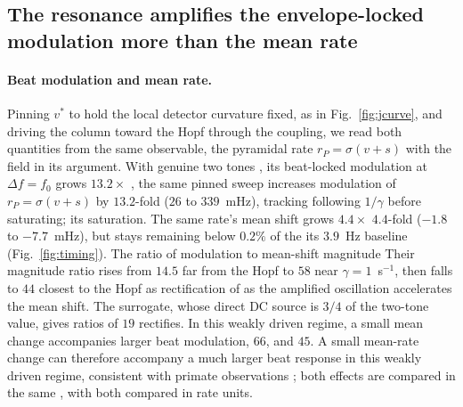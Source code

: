 \documentclass[11pt,a4paper]{article}
\newcommand{\Sig}{\sigma}
\providecommand{\DIFaddtex}[1]{{\protect\color{blue} \sf #1}} %
\providecommand{\DIFdeltex}[1]{{\protect\color{red} \scriptsize #1}} %
\providecommand{\DIFaddbegin}{} %
\providecommand{\DIFaddend}{} %
\providecommand{\DIFdelbegin}{} %
\providecommand{\DIFdelend}{} %
\providecommand{\DIFadd}[1]{\texorpdfstring{\DIFaddtex{#1}}{#1}} %
\providecommand{\DIFdel}[1]{\texorpdfstring{\DIFdeltex{#1}}{}} %
\begin{document}
\DIFdelbegin \subsection{\DIFdel{The resonance amplifies the envelope-locked modulation more than the mean rate}}%
\addtocounter{subsection}{-1}%
\DIFdelend \DIFaddbegin \paragraph{\DIFadd{Beat modulation and mean rate.}}\DIFaddend \label{sec:timing}
\DIFdelbegin \DIFdel{Pinning $v^*$ to hold the local detector
curvature fixed, as in Fig.~\ref{fig:jcurve}, and driving the column toward the Hopf
through the coupling, we read both quantities from the same observable, the pyramidal
rate $r_P=\Sig(v+s)$ with the field in its argument. }\DIFdelend With genuine two tones \DIFdelbegin \DIFdel{, its
beat-locked modulation }\DIFdelend at $\Delta f=f_0$\DIFdelbegin \DIFdel{grows $13.2\times$ }\DIFdelend \DIFaddbegin \DIFadd{, the same pinned sweep
increases modulation of $r_P=\Sig(v+s)$ by $13.2$-fold }\DIFaddend ($26$ to $339$~mHz),
\DIFdelbegin \DIFdel{tracking }\DIFdelend \DIFaddbegin \DIFadd{following }\DIFaddend $1/\gamma$ before \DIFdelbegin \DIFdel{saturating; its }\DIFdelend \DIFaddbegin \DIFadd{saturation. The same rate's }\DIFaddend mean shift grows
\DIFdelbegin \DIFdel{$4.4\times$ }\DIFdelend \DIFaddbegin \DIFadd{$4.4$-fold }\DIFaddend ($-1.8$ to $-7.7$~mHz), \DIFdelbegin \DIFdel{but stays }\DIFdelend \DIFaddbegin \DIFadd{remaining }\DIFaddend below $0.2\%$ of \DIFdelbegin \DIFdel{the }\DIFdelend \DIFaddbegin \DIFadd{its
}\DIFaddend $3.9$~Hz baseline (Fig.~\ref{fig:timing}). \DIFdelbegin \DIFdel{The ratio of modulation to mean-shift magnitude }\DIFdelend \DIFaddbegin \DIFadd{Their magnitude ratio }\DIFaddend rises
from $14.5$ \DIFdelbegin \DIFdel{far from the Hopf }\DIFdelend to $58$ near $\gamma=1$~s$^{-1}$, then falls to $44$ \DIFdelbegin \DIFdel{closest
to the Hopf as
rectification of }\DIFdelend \DIFaddbegin \DIFadd{as
}\DIFaddend the amplified oscillation \DIFdelbegin \DIFdel{accelerates the mean shift. The surrogate, whose direct DC source is $3/4$ of the two-tone value, gives ratios
of $19$}\DIFdelend \DIFaddbegin \DIFadd{rectifies. In this weakly driven regime, a small
mean change accompanies larger beat modulation}\DIFaddend , \DIFdelbegin \DIFdel{$66$, and $45$. A small
mean-rate change can therefore accompany a much
larger beat response in this weakly driven regime, }\DIFdelend consistent with primate observations
\cite{vieira2024}\DIFdelbegin \DIFdel{; both effects are compared in the same }\DIFdelend \DIFaddbegin \DIFadd{, with both compared in }\DIFaddend rate units. \DIFdelbegin %
\end{document}

